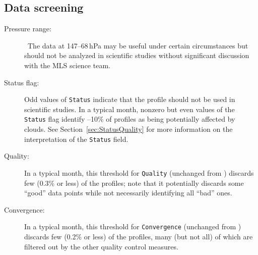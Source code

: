 \begin{nofloatpages}
\subsection{Data screening}
\label{sec:CH3CNScreening}
\begin{description}
  \item[Pressure range:] 

    \standardrangestatement\ The  data at 147--68\,hPa may be useful under certain circumstances but should not be analyzed in scientific studies without significant discussion with the MLS science team.

    \standardprecisionrule

  \item[Status flag:] 

    Odd values of \texttt{Status} indicate that the profile should not be used in scientific studies. In a typical month, nonzero but even values of the \texttt{Status} flag identify --10\% of  profiles as being potentially affected by clouds. See Section~\ref{sec:StatusQuality} for more information on the interpretation of the \texttt{Status} field.

  \item[Quality:] 

    In a typical month, this threshold for \texttt{Quality} (unchanged from \prevv) discards few (0.3\% or less) of the  profiles; note that it potentially discards some ``good'' data points while not necessarily identifying all ``bad'' ones.

  \item[Convergence:] 

    In a typical month, this threshold for \texttt{Convergence} (unchanged from \prevv) discards few (0.2\% or less) of the  profiles, many (but not all) of which are filtered out by the other quality control measures.


\end{description}
\end{nofloatpages}
